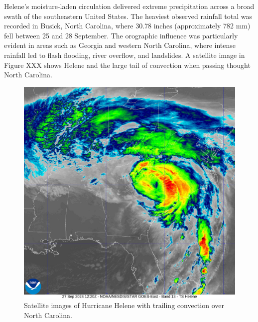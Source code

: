 Helene’s moisture-laden circulation delivered extreme precipitation across a broad swath of the southeastern United States. The heaviest observed rainfall total was recorded in Busick, North Carolina, where 30.78 inches (approximately 782 mm) fell between 25 and 28 September. The orographic influence was particularly evident in areas such as Georgia and western North Carolina, where intense rainfall led to flash flooding, river overflow, and landslides. A satellite image in Figure XXX shows Helene and the large tail of convection when passing thought North Carolina.

\begin{figure}[h!]
	\centering
	\caption{Satellite images of Hurricane Helene with trailing convection over North Carolina.}
	\begin{minipage}[t]{0.45\textwidth}
		\centering
		\includegraphics[width=\textwidth]{docs/figuras/chapter6/20242711220_GOES16-ABI-FL-13-AL092024-2000x2000.jpg}
	\end{minipage}\hfill
	\begin{minipage}[t]{0.45\textwidth}
		\centering

\end{minipage}
\end{figure}
